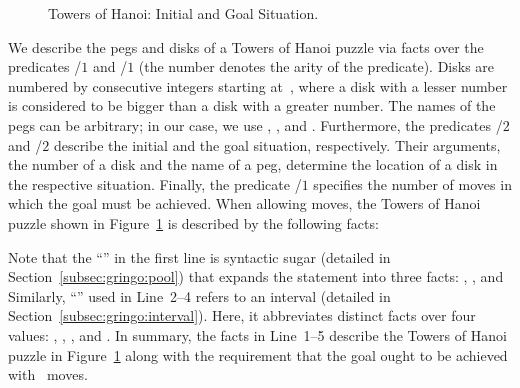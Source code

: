 \begin{figure}[tb]
\centering
\hanoiInstance
\caption{Towers of Hanoi: Initial and Goal Situation.\label{fig:toh_inst}}
\end{figure}
We describe the pegs and disks of a Towers of Hanoi puzzle via facts over the predicates
/$1$ and /$1$ (the number denotes the arity of the predicate).
Disks are numbered by consecutive integers starting at~,
where a disk with a lesser number is considered to be bigger than a disk with a greater number.
The names of the pegs can be arbitrary; in our case, we use , , and . 
Furthermore, the predicates /$2$ and /$2$ describe the initial
and the goal situation, respectively.
Their arguments, the number of a disk and the name of a peg,
determine the location of a disk in the respective situation.
Finally, the predicate /$1$ specifies the number of moves 
in which the goal must be achieved.
When allowing  moves,
the Towers of Hanoi puzzle shown in Figure~\ref{fig:toh_inst} %
is described by the following facts:%
%
%

%
Note that the ``\code{;}'' in the first line is syntactic sugar
(detailed in Section~\ref{subsec:gringo:pool})
that expands the statement into three facts:
, , and 
Similarly, ``'' used in Line~2--4
refers to an interval (detailed in Section~\ref{subsec:gringo:interval}).
Here, it abbreviates distinct facts over four values:
, , , and .
In summary, the facts in Line~1--5 describe the 
Towers of Hanoi puzzle in Figure~\ref{fig:toh_inst} along
with the requirement that the goal ought to be achieved with~ moves.

